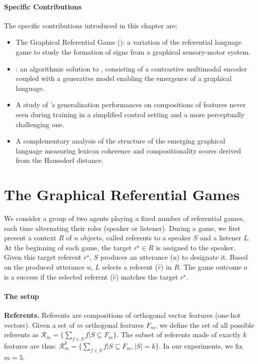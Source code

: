 \paragraph{Specific Contributions} 

The specific contributions introduced in this chapter are:
\begin{itemize}[noitemsep,topsep=0pt]
    \item The Graphical Referential Game (\greg): a variation of the referential language game to study the formation of signs from a graphical sensory-motor system.
    \item \curves: an algorithmic solution to \greg, consisting of a contrastive multimodal encoder coupled with a generative model enabling the emergence of a graphical language.
    \item A study of \curves's generalization performances on compositions of features never seen during training in a simplified control setting and a more perceptually challenging one.
    \item A complementary analysis of the structure of the emerging graphical language measuring lexicon coherence and compositionality scores derived from the Haussdorf distance.
\end{itemize}


\section{The Graphical Referential Games}

\label{sec:prob_def_curves}

We consider a group of two agents playing a fixed number of referential games, each time alternating their roles (speaker or listener). During a game, we first present a context $R$ of $n$ objects, called referents to a speaker $S$ and a listener $L$. At the beginning of each game, the target $r^\star \in R$ is assigned to the speaker. Given this target referent $r^\star$, $S$ produces an utterance ($u$) to designate it. Based on the produced utterance $u$, $L$ selects a referent ($\hat{r}$) in $R$. The game outcome $o$ is a success if the selected referent ($\hat{r}$) matches the target $r^\star$. 

\paragraph{The setup}

\noindent\textbf{Referents. } Referents are compositions of orthogonal vector features (one-hot vectors). Given a set of $m$ orthogonal features $F_m$, we define the set of all possible referents as ${\mathcal{R}_m = \{ \textstyle\sum_{f \in S} f | S \subseteq F_m \}}$. The subset of referents made of exactly $k$ features are thus: ${\mathcal{R}^k_m=\{ \textstyle\sum_{f \in S} f | S \subseteq F_m, |S| = k\}}$. In our experiments, we fix $m=5$.

